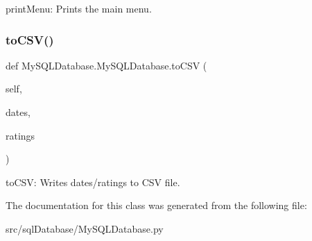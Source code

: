 \begin{DoxyVerb}printMenu: Prints the main menu. \end{DoxyVerb}
 \hypertarget{class_my_s_q_l_database_1_1_my_s_q_l_database_ac7c560ff26c7d9295c4632385f61ce6d}{}\label{class_my_s_q_l_database_1_1_my_s_q_l_database_ac7c560ff26c7d9295c4632385f61ce6d} 
\subsubsection{\texorpdfstring{to\+C\+S\+V()}{toCSV()}}
{\footnotesize\ttfamily def My\+S\+Q\+L\+Database.\+My\+S\+Q\+L\+Database.\+to\+C\+SV (\begin{DoxyParamCaption}\item[{}]{self,  }\item[{}]{dates,  }\item[{}]{ratings }\end{DoxyParamCaption})}

\begin{DoxyVerb}toCSV: Writes dates/ratings to CSV file.  \end{DoxyVerb}
 

The documentation for this class was generated from the following file\+:\begin{DoxyCompactItemize}
\item 
src/sql\+Database/My\+S\+Q\+L\+Database.\+py\end{DoxyCompactItemize}

